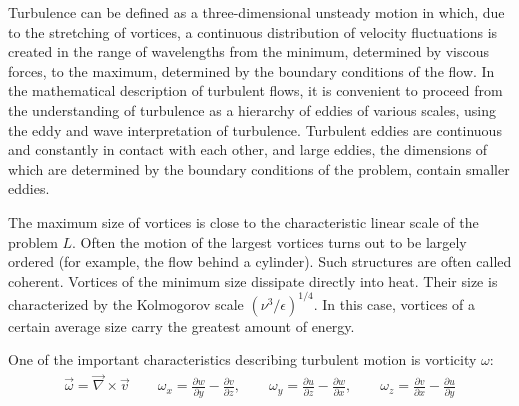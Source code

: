 	Turbulence can be defined as a three-dimensional unsteady motion in which, due to the stretching of vortices, a continuous distribution of velocity fluctuations is created in the range of wavelengths from the minimum, determined by viscous forces, to the maximum, determined by the boundary conditions of the flow. In the mathematical description of turbulent flows, it is convenient to proceed from the understanding of turbulence as a hierarchy of eddies of various scales, using the eddy and wave interpretation of turbulence\cite{Монин1992}. Turbulent eddies are continuous and constantly in contact with each other, and large eddies, the dimensions of which are determined by the boundary conditions of the problem, contain smaller eddies.
	
	The maximum size of vortices is close to the characteristic linear scale of the problem $L$. Often the motion of the largest vortices turns out to be largely ordered (for example, the flow behind a cylinder). Such structures are often called coherent. Vortices of the minimum size dissipate directly into heat. Their size is characterized by the Kolmogorov scale $(\nu^3/\epsilon)^{1/4}$. In this case, vortices of a certain average size carry the greatest amount of energy.
	
	One of the important characteristics describing turbulent motion is vorticity $\omega$: 
	\begin{align}
		\vec{\omega} = \vec{\nabla}\times \vec{v} \qquad \omega_x = \frac{\partial w}{\partial y} - \frac{\partial v}{\partial z}, \qquad \omega_y = \frac{\partial u}{\partial z} - \frac{\partial w}{\partial x}, \qquad \omega_z = \frac{\partial v}{\partial x} - \frac{\partial u}{\partial y}
	\end{align}

